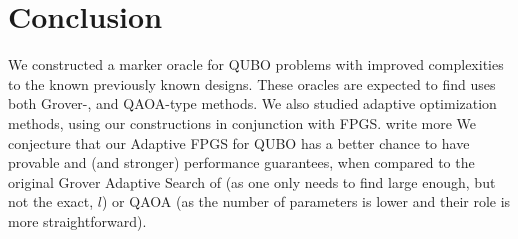 \documentclass[reqno, 12pt]{amsart}
\numberwithin{equation}{section}                %
\begin{document}

\bigskip

\section{Conclusion}
\label{sec:conclusion}

We constructed a marker oracle for QUBO problems with improved complexities to the known previously known designs. These oracles are expected to find uses both Grover-, and QAOA-type methods. We also studied adaptive optimization methods, using our constructions in conjunction with FPGS.
{\color{red} write more}
We conjecture that our Adaptive FPGS for QUBO has a better chance to have provable and (and stronger) performance guarantees, when compared to the original Grover Adaptive Search of \cite{gilliam_grover_2021} (as one only needs to find large enough, but not the exact, $l$) or QAOA (as the number of parameters is lower and their role is more straightforward).

   
\end{document}
